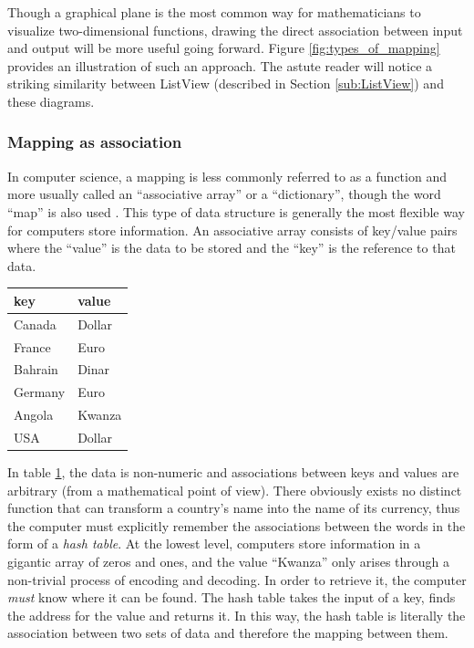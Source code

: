Though a graphical plane is the most common way for mathematicians to visualize two-dimensional functions, drawing the direct association between input and output will be more useful going forward. Figure \ref{fig:types_of_mapping} provides an illustration of such an approach. The astute reader will notice a striking similarity between ListView (described in Section \ref{sub:ListView}) and these diagrams.  


	\subsubsection{Mapping as association}

In computer science, a mapping is less commonly referred to as a function and more usually called an ``associative array'' or a ``dictionary'', though the word ``map'' is also used \cite{data_structures}. This type of data structure is generally the most flexible way for computers store information. An associative array consists of key/value pairs where the ``value'' is the data to be stored and the ``key'' is the reference to that data. 

\begin{table}[!h]
	\centering
	\label{tab:key_value_pairs}
	\begin{tabular}{l l}
		\hline\hline
		key&value\\
		\hline
		Canada&Dollar\\
		France&Euro\\
		Bahrain&Dinar\\
		Germany&Euro\\
		Angola&Kwanza\\
		USA&Dollar\\
		\hline
	\end{tabular}
\end{table}

In table \ref{tab:key_value_pairs}, the data is non-numeric and associations between keys and values are arbitrary (from a mathematical point of view). There obviously exists no distinct function that can transform a country's name into the name of its currency, thus the computer must explicitly remember the associations between the words in the form of a \emph{hash table}. At the lowest level, computers store information in a gigantic array of zeros and ones, and the value ``Kwanza'' only arises through a non-trivial process of encoding and decoding. In order to retrieve it, the computer \emph{must} know where it can be found. The hash table takes the input of a key, finds the address for the value and returns it. In this way, the hash table is literally the association between two sets of data and therefore the mapping between them. 

